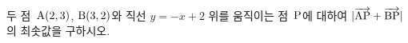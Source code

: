 두 점~$\mathrm{A}(2{,}\mkern3mu\mathopen{}3)$, $\mathrm{B}(3{,}\mkern3mu\mathopen{}2)$와 직선 $y=-x+2$ 위를 움직이는 \mbox{점 $\mathrm{P}$에} 대하여 $|\overrightarrow{\mathrm{AP}}+\overrightarrow{\mathrm{BP}}|$의 최솟값을 구하시오.
